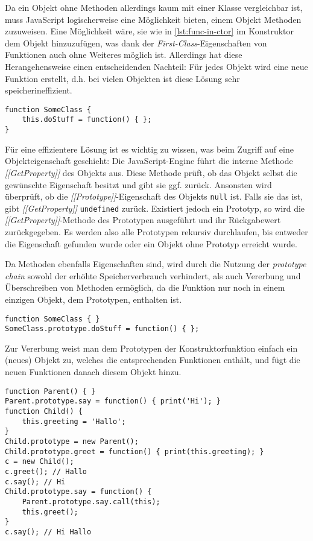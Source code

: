 Da ein Objekt ohne Methoden allerdings kaum mit einer Klasse vergleichbar ist, muss JavaScript
logischerweise eine Möglichkeit bieten, einem Objekt Methoden zuzuweisen. Eine Möglichkeit wäre, sie
wie in \autoref{lst:func-in-ctor} im Konstruktor dem Objekt hinzuzufügen, was dank der
\emph{First-Class}-Eigenschaften von Funktionen auch ohne Weiteres möglich ist. Allerdings hat
diese Herangehensweise einen entscheidenden Nachteil: Für jedes Objekt wird eine neue Funktion
erstellt, d.h. bei vielen Objekten ist diese Lösung sehr speicherineffizient.

\begin{lstlisting}[label=lst:func-in-ctor,caption=Funktionszuweisung im Konstruktor]
function SomeClass {
    this.doStuff = function() { };
}
\end{lstlisting}

Für eine effizientere Lösung ist es wichtig zu wissen, was beim Zugriff auf eine Objekteigenschaft
geschieht: Die JavaScript-Engine führt die interne Methode \emph{[[GetProperty]]} des Objekts aus.
Diese Methode prüft, ob das Objekt selbst die gewünschte Eigenschaft besitzt und gibt sie ggf. zurück.
Ansonsten wird überprüft, ob die \emph{[[Prototype]]}-Eigenschaft des
Objekts \lstinline{null} ist. Falls sie das ist, gibt \emph{[[GetProperty]]} \lstinline{undefined}
zurück. Existiert jedoch ein Prototyp, so wird die \emph{[[GetProperty]]}-Methode des Prototypen
ausgeführt und ihr Rückgabewert zurückgegeben. Es werden also alle Prototypen rekursiv durchlaufen,
bis entweder die Eigenschaft gefunden wurde oder ein Objekt ohne Prototyp erreicht wurde.

Da Methoden ebenfalls Eigenschaften sind, wird durch die Nutzung der \emph{prototype chain} sowohl
der erhöhte Speicherverbrauch verhindert, als auch Vererbung und Überschreiben von Methoden
ermöglich, da die Funktion nur noch in einem einzigen Objekt, dem Prototypen, enthalten ist.

\begin{lstlisting}[label=lst:func-in-proto,caption=Funktionszuweisung im Prototypen]
function SomeClass { }
SomeClass.prototype.doStuff = function() { };
\end{lstlisting}

Zur Vererbung weist man dem Prototypen der Konstruktorfunktion einfach ein (neues) Objekt zu,
welches die entsprechenden Funktionen enthält, und fügt die neuen Funktionen danach diesem Objekt
hinzu.

\begin{lstlisting}[label=lst:proto-inheritance,caption=Prototypische Vererbung]
function Parent() { }
Parent.prototype.say = function() { print('Hi'); }
function Child() {
    this.greeting = 'Hallo';
}
Child.prototype = new Parent();
Child.prototype.greet = function() { print(this.greeting); }
c = new Child();
c.greet(); // Hallo
c.say(); // Hi
Child.prototype.say = function() {
    Parent.prototype.say.call(this);
    this.greet();
}
c.say(); // Hi Hallo
\end{lstlisting}

